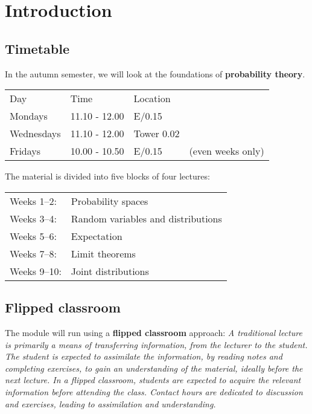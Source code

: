 \chapter{Introduction}\label{chap:intro}

\section{Timetable}

In the autumn semester, we will look at the foundations of \textbf{probability theory}. 

\begin{table}[h]
\centering
\begin{tabular}{|llll|}\hline
Day			& Time			& Location	& \\
Mondays		& 11.10 - 12.00	& E/0.15 	& \\
Wednesdays	& 11.10 - 12.00	& Tower 0.02	& \\
Fridays		& 10.00 - 10.50	& E/0.15		& (even weeks only) \\ \hline
\end{tabular}
\end{table}


The material is divided into five blocks of four lectures:

\begin{tabular}{ll}
Weeks 1--2:	& Probability spaces \\
Weeks 3--4:	& Random variables and distributions \\
Weeks 5--6:	& Expectation \\
Weeks 7--8:	& Limit theorems \\ 
Weeks 9--10:	& Joint distributions
\end{tabular}


\section{Flipped classroom}
The module will run using a \textbf{flipped classroom} approach:
\bit
\it A traditional lecture is primarily a means of transferring information, from the lecturer to the student. The student is expected to assimilate the information, by reading notes and completing exercises, to gain an understanding of the material, ideally before the next lecture.
\it
In a flipped classroom, students are expected to acquire the relevant information \emph{before} attending the class. Contact hours are dedicated to discussion and exercises, leading to assimilation and understanding.
\eit


